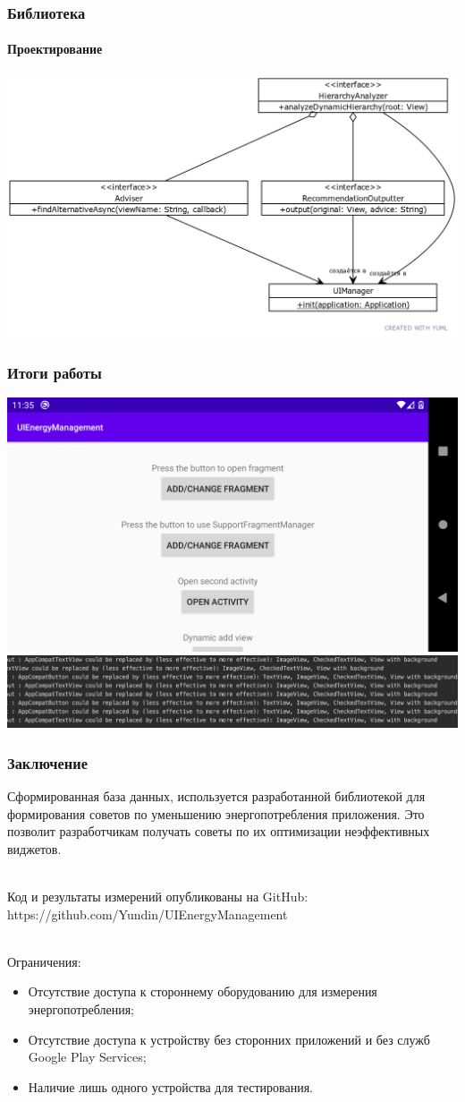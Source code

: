 \documentclass{beamer}
\begin{document}
    \begin{frame}
        \frametitle{Библиотека}
        \framesubtitle{Проектирование}
        \includegraphics[width=\linewidth]{uml_interfaces}
    \end{frame}
    \begin{frame}
        \frametitle{Итоги работы}
        \centering
        \includegraphics[width=0.8\linewidth]{example}
        \includegraphics[width=\linewidth]{example_log}
    \end{frame}
    \begin{frame}
        \frametitle{Заключение}
        Сформированная база данных, используется разработанной библиотекой для формирования советов по уменьшению энергопотребления приложения. Это позволит разработчикам получать советы по их оптимизации неэффективных виджетов.\\~
        
        Код и результаты измерений опубликованы на GitHub: https://github.com/Yundin/UIEnergyManagement\\~

        Ограничения:
        \begin{itemize}
            \item Отсутствие доступа к стороннему оборудованию для измерения энергопотребления;
            \item Отсутствие доступа к устройству без сторонних приложений и без служб Google Play Services;
            \item Наличие лишь одного устройства для тестирования.
        \end{itemize}
    \end{frame}
\end{document}
